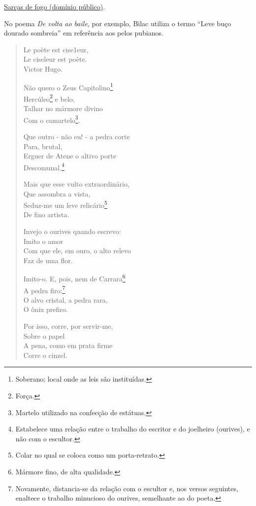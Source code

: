 \href{http://www.dominiopublico.gov.br/download/texto/bv000287.pdf}{Sarças de fogo (domínio público)}.

No poema \textit{De volta ao baile}, por exemplo, Bilac utiliza o termo ``Leve buço dourado sombreia'' em referência aos pelos pubianos.

\begin{verse}
Le poète est cise1eur, \\
Le ciseleur est poète. \\
Victor Hugo.

Não quero o Zeus Capitolino\footnote{Soberano; local onde as leis são instituídas.} \\
Hercúleo\footnote{Força.} e belo, \\
Talhar no mármore divino \\
Com o camartelo\footnote{Martelo utilizado na confecção de estátuas.}.

Que outro - não eu! - a pedra corte \\
Para, brutal, \\
Erguer de Atene o altivo porte \\
Descomunal.\footnote{Estabelece uma relação entre o trabalho do escritor e do joelheiro (ourives), e não com o escultor.}

Mais que esse vulto extraordinário, \\
Que assombra a vista, \\
Seduz-me um leve relicário\footnote{Colar no qual se coloca como um porta-retrato.} \\
De fino artista.

Invejo o ourives quando escrevo: \\
Imito o amor \\
Com que ele, em ouro, o alto relevo \\
Faz de uma flor.

Imito-o. E, pois, nem de Carrara\footnote{Mármore fino, de alta qualidade.} \\
A pedra firo:\footnote{Novamente, distancia-se da relação com o escultor e, nos versos seguintes, enaltece o trabalho minucioso do ourives, semelhante ao do poeta.} \\
O alvo cristal, a pedra rara, \\
O ônix prefiro.

Por isso, corre, por servir-me, \\
Sobre o papel \\
A pena, como em prata firme \\
Corre o cinzel.


\end{verse}
